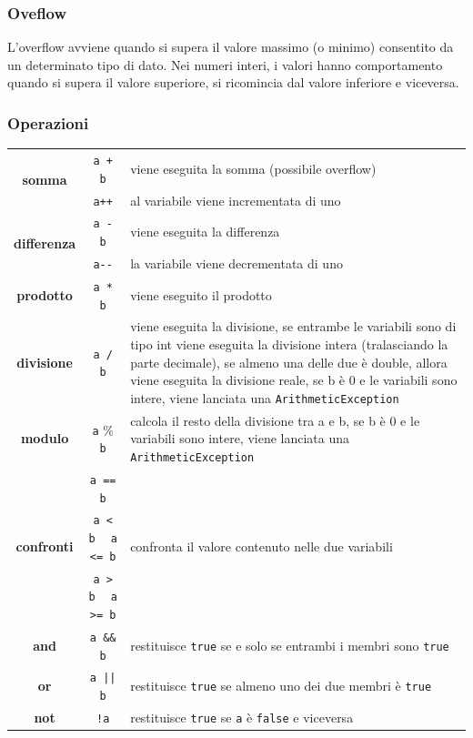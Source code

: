 \documentclass{article}
\begin{document}
\subsubsection*{Oveflow}
L'overflow avviene quando si supera il valore massimo (o minimo) consentito da un determinato tipo di dato. Nei numeri
interi, i valori hanno comportamento  quando si supera il valore superiore, si ricomincia dal valore inferiore 
e viceversa.

\subsubsection*{Operazioni}
\begin{center}
	\begin{tabularx}{\textwidth}{c c X}		
		\multirow{2}{*}{\textbf{somma}}
		& \verb|a + b| & viene eseguita la somma (possibile overflow) \\
		& \verb|a++| & al variabile viene incrementata di uno \\
		\midrule

		\multirow{2}{*}{\textbf{differenza}}
		& \verb|a - b| & viene eseguita la differenza \\
		& \verb|a--| & la variabile viene decrementata di uno \\
		\midrule
		
		\textbf{prodotto}
		& \verb|a * b| & viene eseguito il prodotto \\
		\midrule
		
		\textbf{divisione}
		& \verb|a / b| & viene eseguita la divisione, se entrambe le variabili sono di tipo int viene eseguita la divisione
		intera (tralasciando la parte decimale), se almeno una delle due è double, allora viene eseguita la divisione reale,
		se b è 0 e le variabili sono intere, viene lanciata una \verb|ArithmeticException| \\
		\midrule
		
		\textbf{modulo}
		& \verb|a| \% \verb|b| & calcola il resto della divisione tra a e b, se b è 0 e le variabili sono intere, viene
		lanciata una \verb|ArithmeticException| \\
		\midrule
		
		\multirow{3}{*}{\textbf{confronti}}
		& \verb|a == b| & \multirow{3}{*}{confronta il valore contenuto nelle due variabili} \\
		& \verb|a < b| \(\;\;\) \verb|a <= b| & \\
		& \verb|a > b| \(\;\;\) \verb|a >= b| & \\
		\midrule

		\textbf{and}
		& \verb|a && b| & restituisce \verb|true| se e solo se entrambi i membri sono \verb|true| \\
		\midrule

		\textbf{or}
		& \verb=a || b= & restituisce \verb|true| se almeno uno dei due membri è \verb|true| \\
		\midrule

		\textbf{not}
		& \verb|!a| & restituisce \verb|true| se \verb|a| è \verb|false| e viceversa
	\end{tabularx}
\end{center}
\end{document}
